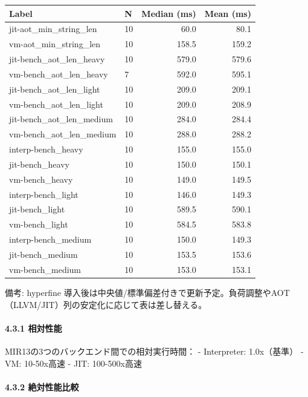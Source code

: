 \documentclass[
]{article}
\begin{document}
\begin{longtable}[]{@{}llrr@{}}
\toprule\noalign{}
Label & N & Median (ms) & Mean (ms) \\
\midrule\noalign{}
\endhead
\bottomrule\noalign{}
\endlastfoot
jit-aot\_min\_string\_len & 10 & 60.0 & 80.1 \\
vm-aot\_min\_string\_len & 10 & 158.5 & 159.2 \\
jit-bench\_aot\_len\_heavy & 10 & 579.0 & 579.6 \\
vm-bench\_aot\_len\_heavy & 7 & 592.0 & 595.1 \\
jit-bench\_aot\_len\_light & 10 & 209.0 & 209.1 \\
vm-bench\_aot\_len\_light & 10 & 209.0 & 208.9 \\
jit-bench\_aot\_len\_medium & 10 & 284.0 & 284.4 \\
vm-bench\_aot\_len\_medium & 10 & 288.0 & 288.2 \\
interp-bench\_heavy & 10 & 155.0 & 155.0 \\
jit-bench\_heavy & 10 & 150.0 & 150.1 \\
vm-bench\_heavy & 10 & 149.0 & 149.5 \\
interp-bench\_light & 10 & 146.0 & 149.3 \\
jit-bench\_light & 10 & 589.5 & 590.1 \\
vm-bench\_light & 10 & 584.5 & 583.8 \\
interp-bench\_medium & 10 & 150.0 & 149.3 \\
jit-bench\_medium & 10 & 153.5 & 153.6 \\
vm-bench\_medium & 10 & 153.0 & 153.1 \\
\end{longtable}

備考: hyperfine
導入後は中央値/標準偏差付きで更新予定。負荷調整やAOT（LLVM/JIT）列の安定化に応じて表は差し替える。

\hypertarget{ux76f8ux5bfeux6027ux80fd}{%
\paragraph{4.3.1 相対性能}\label{ux76f8ux5bfeux6027ux80fd}}

MIR13の3つのバックエンド間での相対実行時間： - Interpreter: 1.0x（基準）
- VM: 10-50x高速 - JIT: 100-500x高速

\hypertarget{ux7d76ux5bfeux6027ux80fdux6bd4ux8f03}{%
\paragraph{4.3.2
絶対性能比較}\label{ux7d76ux5bfeux6027ux80fdux6bd4ux8f03}}
\end{document}
